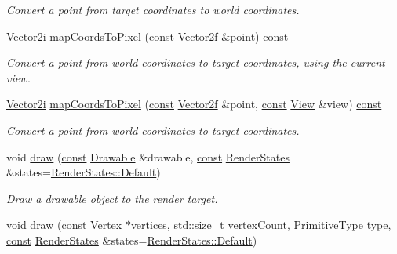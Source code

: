 \begin{DoxyCompactItemize}
\begin{DoxyCompactList}\small\item\em Convert a point from target coordinates to world coordinates. \end{DoxyCompactList}\item 
\hyperlink{namespacesf_a0eed58bf66694ebbc55f72ca7de840d9}{Vector2i} \hyperlink{classsf_1_1_render_target_aa0c11e1989573f2cce64c621205f8e83}{map\-Coords\-To\-Pixel} (\hyperlink{term__entry_8h_a57bd63ce7f9a353488880e3de6692d5a}{const} \hyperlink{namespacesf_a80cea3c46537294fd1d8d428566ad8b2}{Vector2f} \&point) \hyperlink{term__entry_8h_a57bd63ce7f9a353488880e3de6692d5a}{const} 
\begin{DoxyCompactList}\small\item\em Convert a point from world coordinates to target coordinates, using the current view. \end{DoxyCompactList}\item 
\hyperlink{namespacesf_a0eed58bf66694ebbc55f72ca7de840d9}{Vector2i} \hyperlink{classsf_1_1_render_target_a7a2d427bdb9bd8f9f456fcf82813aa60}{map\-Coords\-To\-Pixel} (\hyperlink{term__entry_8h_a57bd63ce7f9a353488880e3de6692d5a}{const} \hyperlink{namespacesf_a80cea3c46537294fd1d8d428566ad8b2}{Vector2f} \&point, \hyperlink{term__entry_8h_a57bd63ce7f9a353488880e3de6692d5a}{const} \hyperlink{classsf_1_1_view}{View} \&view) \hyperlink{term__entry_8h_a57bd63ce7f9a353488880e3de6692d5a}{const} 
\begin{DoxyCompactList}\small\item\em Convert a point from world coordinates to target coordinates. \end{DoxyCompactList}\item 
void \hyperlink{classsf_1_1_render_target_a12417a3bcc245c41d957b29583556f39}{draw} (\hyperlink{term__entry_8h_a57bd63ce7f9a353488880e3de6692d5a}{const} \hyperlink{classsf_1_1_drawable}{Drawable} \&drawable, \hyperlink{term__entry_8h_a57bd63ce7f9a353488880e3de6692d5a}{const} \hyperlink{classsf_1_1_render_states}{Render\-States} \&states=\hyperlink{classsf_1_1_render_states_afa30e6d780c05c2a20587ddb01b5fa5c}{Render\-States\-::\-Default})
\begin{DoxyCompactList}\small\item\em Draw a drawable object to the render target. \end{DoxyCompactList}\item 
void \hyperlink{classsf_1_1_render_target_a976bc94057799eb9f8a18ac5fdfd9b73}{draw} (\hyperlink{term__entry_8h_a57bd63ce7f9a353488880e3de6692d5a}{const} \hyperlink{classsf_1_1_vertex}{Vertex} $\ast$vertices, \hyperlink{nc__alloc_8h_a7b60c5629e55e8ec87a4547dd4abced4}{std\-::size\-\_\-t} vertex\-Count, \hyperlink{group__graphics_ga5ee56ac1339984909610713096283b1b}{Primitive\-Type} \hyperlink{_entity_8cpp_aa209819775142a76b8e49319d79ecab2}{type}, \hyperlink{term__entry_8h_a57bd63ce7f9a353488880e3de6692d5a}{const} \hyperlink{classsf_1_1_render_states}{Render\-States} \&states=\hyperlink{classsf_1_1_render_states_afa30e6d780c05c2a20587ddb01b5fa5c}{Render\-States\-::\-Default})

\end{DoxyCompactItemize}
